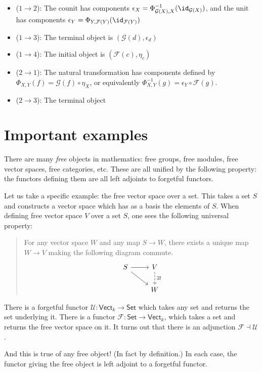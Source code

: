\documentclass[main.tex]{subfiles}
\begin{document}
\begin{itemize}
  \item ($1 \to 2$): The counit has components $\epsilon_{X} = \Phi^{-1}_{\mathcal{G}(X),X}(\id_{\mathcal{G}(X)})$, and the unit has components $\epsilon_{Y} = \Phi_{Y,\mathcal{F}(Y)}(\id_{\mathcal{F}(Y)})$

  \item ($1 \to 3$): The terminal object is $(\mathcal{G}(d), \epsilon_{d})$

  \item ($1 \to 4$): The initial object is $(\mathcal{F}(c), \eta_{c})$

  \item ($2 \to 1$): The natural transformation has components defined by $\Phi_{X,Y}(f) = \mathcal{G}(f) \circ \eta_{X}$, or equivalently $\Phi_{X,Y}^{-1}(g) = \epsilon_{Y} \circ \mathcal{F}(g)$.

  \item ($2 \to 3$): The terminal object
\end{itemize}

\section{Important examples}
\label{sec:important_examples}

\begin{example}
  \label{eg:freeforgetfuladjunctions}
  There are many \emph{free} objects in mathematics: free groups, free modules, free vector spaces, free categories, etc. These are all unified by the following property: the functors defining them are all left adjoints to forgetful functors.

  Let us take a specific example: the free vector space over a set. This takes a set $S$ and constructs a vector space which has as a basis the elements of $S$. When defining free vector space $V$ over a set $S$, one sees the following universal property:
  \begin{quote}
    For any vector space $W$ and any map $S \to W$, there exists a unique map $W \to V$ making the following diagram commute.
    \begin{equation*}
      \begin{tikzcd}
        S
        \arrow[r]
        \arrow[dr]
        & V
        \arrow[d, dashed, "\exists!"]
        \\
        & W
      \end{tikzcd}
    \end{equation*}
  \end{quote}

  There is a forgetful functor $\mathcal{U}\colon \mathsf{Vect}_{k} \rightarrow \mathsf{Set}$ which takes any set and returns the set underlying it. There is a functor $\mathcal{F}\colon \mathsf{Set} \rightarrow \mathsf{Vect}_{k}$, which takes a set and returns the free vector space on it. It turns out that there is an adjunction $\mathcal{F} \dashv \mathcal{U}$.

  And this is true of any free object! (In fact by definition.) In each case, the functor giving the free object is left adjoint to a forgetful functor.
\end{example}
\end{document}
